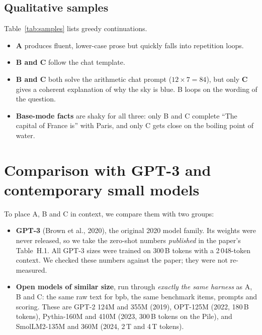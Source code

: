 \documentclass[10pt,a4paper]{article}
\begin{document}
\subsection{Qualitative samples}

Table~\ref{tab:samples} lists greedy continuations.
\begin{itemize}
  \item \textbf{A} produces fluent, lower-case prose but quickly falls into repetition loops.
  \item \textbf{B and C} follow the chat template.
  \item \textbf{B and C} both solve the arithmetic chat prompt ($12\times7=84$), but only \textbf{C} gives a coherent explanation of why the sky is blue. B loops on the wording of the question.
  \item \textbf{Base-mode facts} are shaky for all three: only B and C complete ``The capital of France is'' with Paris, and only C gets close on the boiling point of water.
\end{itemize}

\section{Comparison with GPT-3 and contemporary small models}
\label{sec:baselines}

To place A, B and C in context, we compare them with two groups:
\begin{itemize}
  \item \textbf{GPT-3} (Brown et al., 2020), the original 2020 model family. Its weights were never released, so we take the zero-shot numbers \emph{published} in the paper's Table~H.1. All GPT-3 sizes were trained on 300\,B tokens with a 2\,048-token context. We checked these numbers against the paper; they were not re-measured.
  \item \textbf{Open models of similar size}, run through \emph{exactly the same harness} as A, B and C: the same raw text for bpb, the same benchmark items, prompts and scoring. These are GPT-2 124M and 355M (2019), OPT-125M (2022, 180\,B tokens), Pythia-160M and 410M (2023, 300\,B tokens on the Pile), and SmolLM2-135M and 360M (2024, 2\,T and 4\,T tokens).
\end{itemize}

\begin{table}[h]
\centering\scriptsize
\setlength{\tabcolsep}{4pt}

\caption{Zero-shot comparison. $^\dagger$GPT-3 rows are published values (HellaSwag and PIQA on dev, ARC-Easy and LAMBADA on test, full sets). All other rows were measured here on the same items: the first 2\,000 of HellaSwag (dev), ARC-Easy (test) and LAMBADA-OpenAI, and all 1\,838 PIQA dev items. HellaSwag and PIQA are length-normalised accuracy. ``bpb'' is the mean over the four pipeline domains at 512 tokens. Training-token counts are as reported by each model's authors (n/r = not reported).}
\label{tab:baselines}
\end{table}
\end{document}
